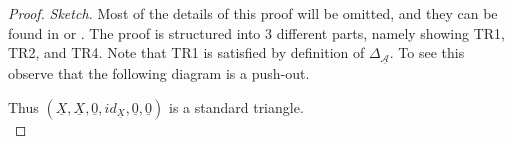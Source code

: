     \begin{proof}\emph{Sketch.}
        Most of the details of this proof will be omitted, and they can be found in \cite{happel} or \cite{May01}. The proof is structured into 3 different parts, namely showing TR1, TR2, and TR4. Note that TR1 is satisfied by definition of $\Delta_{\underline{\mathcal{A}}}$. To see this observe that the following diagram is a push-out.
        \begin{center}
        \end{center}
        Thus $(\underline{X},\underline{X},\underline{0},id_{\underline{X}},\underline{0},\underline{0})$ is a standard triangle. \\

        

\end{proof}
